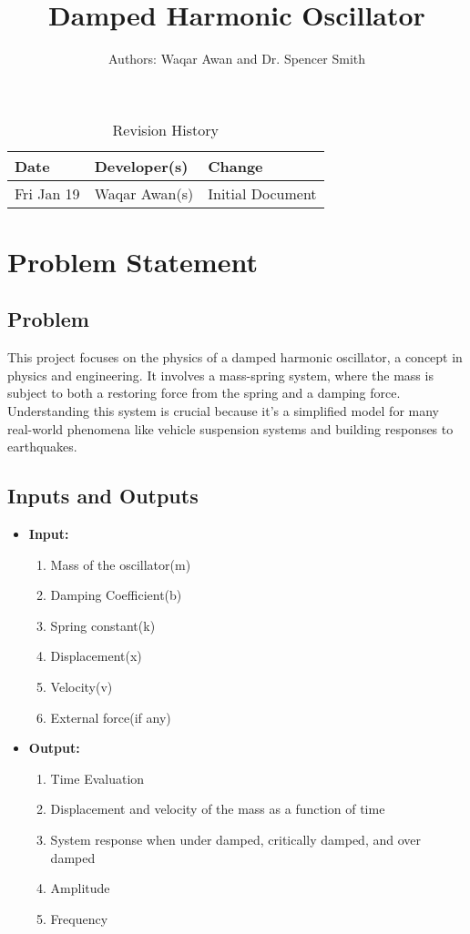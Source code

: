 \documentclass{article}
\title{Damped Harmonic Oscillator\\}
\author{Authors: Waqar Awan and Dr. Spencer Smith }
\date{}
\begin{document}
\maketitle

\begin{table}[hp]
\caption{Revision History} \label{TblRevisionHistory}
\begin{tabularx}{\textwidth}{llX}
\toprule
\textbf{Date} & \textbf{Developer(s)} & \textbf{Change}\\
\midrule
Fri Jan 19 & Waqar Awan(s) & Initial Document\\
\bottomrule
\end{tabularx}
\end{table}

\section{Problem Statement}

\subsection{Problem}
This project focuses on the physics of a damped harmonic oscillator, a concept in physics and engineering. 
It involves a mass-spring system, where the mass is subject to both a restoring force from the spring and a damping force. 
Understanding this system is crucial because it's a simplified model for many real-world phenomena like vehicle suspension systems and building responses to earthquakes.

\subsection{Inputs and Outputs}

\begin{itemize}
    \item \textbf{Input:} \begin{enumerate}
        \item Mass of the oscillator(m)
        \item Damping Coefficient(b)
        \item Spring constant(k)
        \item Displacement(x)
        \item Velocity(v)
        \item External force(if any)
    \end{enumerate}

    \item \textbf{Output:} \begin{enumerate}
        \item Time Evaluation
        \item Displacement and velocity of the mass as a function of time
        \item System response when under damped, critically damped, and over damped
        \item Amplitude
        \item Frequency
    \end{enumerate}
\end{itemize}
\end{document}
